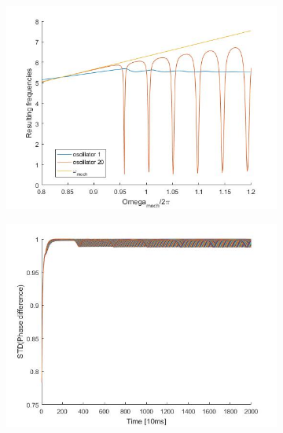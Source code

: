 \documentclass[a4paper]{scrartcl}
\begin{document}
\begin{figure}[h]
	\centering
	\begin{subfigure}[b]{0.49\textwidth}
		\centering
		\includegraphics[width=\textwidth]{results/6.c/Freq_A_const.jpg}
		\caption{}\label{4a}
	\end{subfigure}
	\centering
	\begin{subfigure}[b]{0.49\textwidth}
		\centering
		\includegraphics[width=\textwidth]{results/6.c/Phase_A_const.jpg}
		\caption{}\label{4b}
	\end{subfigure}
	\centering
	\begin{subfigure}[b]{0.49\textwidth}
		\centering

\end{subfigure}
\end{figure}
\end{document}
